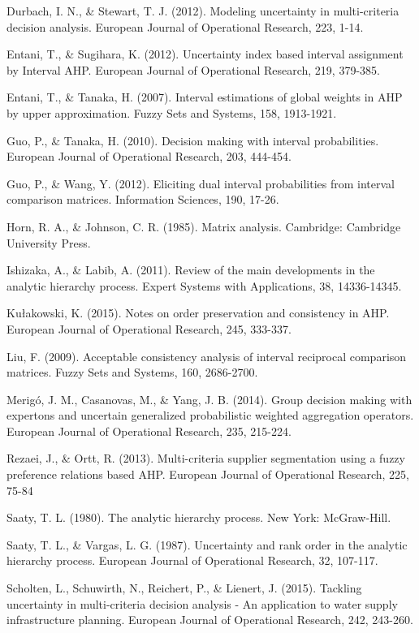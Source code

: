 \documentclass[10pt]{article}
\begin{document}
Durbach, I. N., \& Stewart, T. J. (2012). Modeling uncertainty in multi-criteria decision analysis. European Journal of Operational Research, 223, 1-14.

Entani, T., \& Sugihara, K. (2012). Uncertainty index based interval assignment by Interval AHP. European Journal of Operational Research, 219, 379-385.

Entani, T., \& Tanaka, H. (2007). Interval estimations of global weights in AHP by upper approximation. Fuzzy Sets and Systems, 158, 1913-1921.

Guo, P., \& Tanaka, H. (2010). Decision making with interval probabilities. European Journal of Operational Research, 203, 444-454.

Guo, P., \& Wang, Y. (2012). Eliciting dual interval probabilities from interval comparison matrices. Information Sciences, 190, 17-26.

Horn, R. A., \& Johnson, C. R. (1985). Matrix analysis. Cambridge: Cambridge University Press.

Ishizaka, A., \& Labib, A. (2011). Review of the main developments in the analytic hierarchy process. Expert Systems with Applications, 38, 14336-14345.

Kułakowski, K. (2015). Notes on order preservation and consistency in AHP. European Journal of Operational Research, 245, 333-337.

Liu, F. (2009). Acceptable consistency analysis of interval reciprocal comparison matrices. Fuzzy Sets and Systems, 160, 2686-2700.

Merigó, J. M., Casanovas, M., \& Yang, J. B. (2014). Group decision making with expertons and uncertain generalized probabilistic weighted aggregation operators. European Journal of Operational Research, 235, 215-224.

Rezaei, J., \& Ortt, R. (2013). Multi-criteria supplier segmentation using a fuzzy preference relations based AHP. European Journal of Operational Research, 225, 75-84

Saaty, T. L. (1980). The analytic hierarchy process. New York: McGraw-Hill.

Saaty, T. L., \& Vargas, L. G. (1987). Uncertainty and rank order in the analytic hierarchy process. European Journal of Operational Research, 32, 107-117.

Scholten, L., Schuwirth, N., Reichert, P., \& Lienert, J. (2015). Tackling uncertainty in multi-criteria decision analysis - An application to water supply infrastructure planning. European Journal of Operational Research, 242, 243-260.
\end{document}
